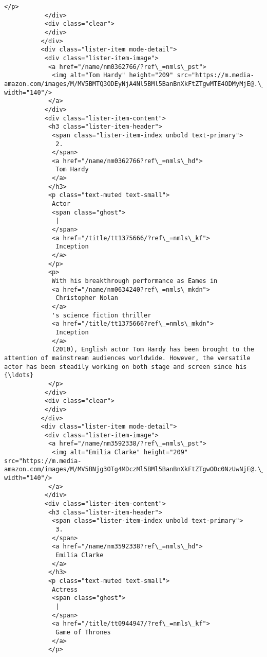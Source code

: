 \documentclass[11pt]{article}
\begin{document}
\begin{Verbatim}[commandchars=\\\{\}]
            </p>
           </div>
           <div class="clear">
           </div>
          </div>
          <div class="lister-item mode-detail">
           <div class="lister-item-image">
            <a href="/name/nm0362766/?ref\_=nmls\_pst">
             <img alt="Tom Hardy" height="209" src="https://m.media-amazon.com/images/M/MV5BMTQ3ODEyNjA4Nl5BMl5BanBnXkFtZTgwMTE4ODMyMjE@.\_V1\_UX140\_CR0,0,140,209\_AL\_.jpg" width="140"/>
            </a>
           </div>
           <div class="lister-item-content">
            <h3 class="lister-item-header">
             <span class="lister-item-index unbold text-primary">
              2.
             </span>
             <a href="/name/nm0362766?ref\_=nmls\_hd">
              Tom Hardy
             </a>
            </h3>
            <p class="text-muted text-small">
             Actor
             <span class="ghost">
              |
             </span>
             <a href="/title/tt1375666/?ref\_=nmls\_kf">
              Inception
             </a>
            </p>
            <p>
             With his breakthrough performance as Eames in
             <a href="/name/nm0634240?ref\_=nmls\_mkdn">
              Christopher Nolan
             </a>
             's science fiction thriller
             <a href="/title/tt1375666?ref\_=nmls\_mkdn">
              Inception
             </a>
             (2010), English actor Tom Hardy has been brought to the attention of mainstream audiences worldwide. However, the versatile actor has been steadily working on both stage and screen since his {\ldots}
            </p>
           </div>
           <div class="clear">
           </div>
          </div>
          <div class="lister-item mode-detail">
           <div class="lister-item-image">
            <a href="/name/nm3592338/?ref\_=nmls\_pst">
             <img alt="Emilia Clarke" height="209" src="https://m.media-amazon.com/images/M/MV5BNjg3OTg4MDczMl5BMl5BanBnXkFtZTgwODc0NzUwNjE@.\_V1\_UX140\_CR0,0,140,209\_AL\_.jpg" width="140"/>
            </a>
           </div>
           <div class="lister-item-content">
            <h3 class="lister-item-header">
             <span class="lister-item-index unbold text-primary">
              3.
             </span>
             <a href="/name/nm3592338?ref\_=nmls\_hd">
              Emilia Clarke
             </a>
            </h3>
            <p class="text-muted text-small">
             Actress
             <span class="ghost">
              |
             </span>
             <a href="/title/tt0944947/?ref\_=nmls\_kf">
              Game of Thrones
             </a>
            </p>

\end{Verbatim}
\end{document}
